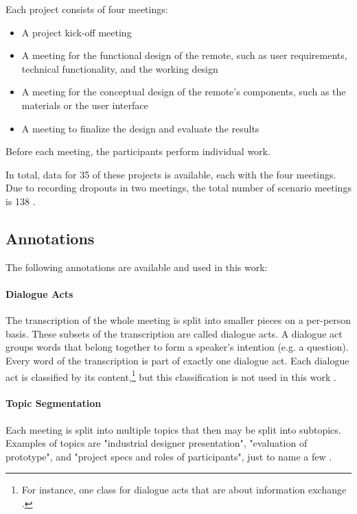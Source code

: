 Each project consists of four meetings:
\begin{itemize}
\item A project kick-off meeting
\item A meeting for the functional design of the remote, such as user requirements, technical functionality, and the working design
\item A meeting for the conceptual design of the remote's components, such as the materials or the user interface
\item A meeting to finalize the design and evaluate the results
\end{itemize}
Before each meeting, the participants perform individual work.

In total, data for 35 of these projects is available, each with the four meetings. 
Due to recording dropouts in two meetings, the total number of scenario meetings is 138 \cite[p.~2]{Mccowan05theami}.

\subsection{Annotations}\label{ssec:ami-annotations}

The following annotations are available and used in this work:

\paragraph{Dialogue Acts}

The transcription of the whole meeting is split into smaller pieces on a per-person basis.
These subsets of the transcription are called dialogue acts.
A dialogue act groups words that belong together to form a speaker's intention (e.g. a question).
Every word of the transcription is part of exactly one dialogue act.
Each dialogue act is classified by its content,\footnote{For instance, one class for dialogue acts that are about information exchange \cite[p.~8]{guidelinesAmiDA}.} but this classification is not used in this work \cite{amiWebsite}.

\paragraph{Topic Segmentation}

Each meeting is split into multiple topics that then may be split into subtopics.
Examples of topics are "industrial designer presentation", "evaluation of prototype", and "project specs and roles of participants", just to name a few \cite{amiWebsite}.

